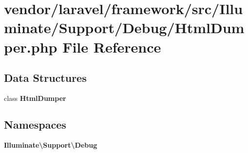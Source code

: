 \section{vendor/laravel/framework/src/\+Illuminate/\+Support/\+Debug/\+Html\+Dumper.php File Reference}
\label{laravel_2framework_2src_2_illuminate_2_support_2_debug_2_html_dumper_8php}
\subsection*{Data Structures}
\begin{DoxyCompactItemize}
\item 
class {\bf Html\+Dumper}
\end{DoxyCompactItemize}
\subsection*{Namespaces}
\begin{DoxyCompactItemize}
\item 
 {\bf Illuminate\textbackslash{}\+Support\textbackslash{}\+Debug}
\end{DoxyCompactItemize}
